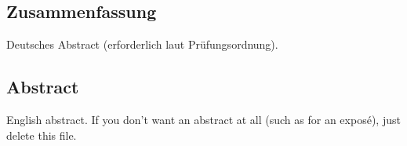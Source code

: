\subsection*{Zusammenfassung}

Deutsches Abstract (erforderlich laut Prüfungsordnung).


\subsection*{Abstract}

English abstract. If you don't want an abstract at all (such as for an exposé), just delete this file.
